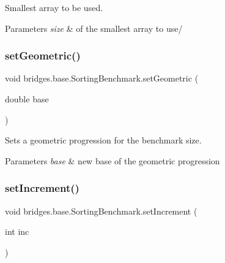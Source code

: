 Smallest array to be used. 


\begin{DoxyParams}{Parameters}
{\em size} & of the smallest array to use/ \\
\hline
\end{DoxyParams}
\mbox{\label{classbridges_1_1base_1_1_sorting_benchmark_ac85461710590f4baeea7d7b72da3d66f}} 
\subsubsection{\texorpdfstring{set\+Geometric()}{setGeometric()}}
{\footnotesize\ttfamily void bridges.\+base.\+Sorting\+Benchmark.\+set\+Geometric (\begin{DoxyParamCaption}\item[{double}]{base }\end{DoxyParamCaption})}



Sets a geometric progression for the benchmark size. 


\begin{DoxyParams}{Parameters}
{\em base} & new base of the geometric progression \\
\hline
\end{DoxyParams}
\mbox{\label{classbridges_1_1base_1_1_sorting_benchmark_aed0a9db639ec08c6ae1b5b70a1662809}} 
\subsubsection{\texorpdfstring{set\+Increment()}{setIncrement()}}
{\footnotesize\ttfamily void bridges.\+base.\+Sorting\+Benchmark.\+set\+Increment (\begin{DoxyParamCaption}\item[{int}]{inc }\end{DoxyParamCaption})}



